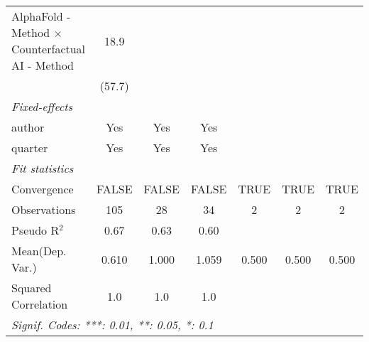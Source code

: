 \begin{tabular}{lcccccc}
   AlphaFold - Method $\times$ Counterfactual AI - Method  & 18.9          &         &         &      &      &   \\   
                                                           & (57.7)        &         &         &      &      &   \\   
   \midrule
   \emph{Fixed-effects}\\
   author                                                  & Yes           & Yes     & Yes     &      &      & \\  
   quarter                                                 & Yes           & Yes     & Yes     &      &      & \\  
   \midrule
   \emph{Fit statistics}\\
   Convergence                                             &FALSE          & FALSE   & FALSE   & TRUE & TRUE & TRUE\\  
   Observations                                            & 105           & 28      & 34      & 2    & 2    & 2\\  
   Pseudo R$^2$                                            & 0.67          & 0.63    & 0.60    &      &      & \\  
Mean(Dep. Var.) & 0.610 & 1.000 & 1.059 & 0.500 & 0.500 & 0.500 \\
   Squared Correlation                                     & 1.0           & 1.0     & 1.0     &      &      & \\  
   \midrule \midrule
   \multicolumn{7}{l}{\emph{Signif. Codes: ***: 0.01, **: 0.05, *: 0.1}}\\
\end{tabular}
\par\endgroup
